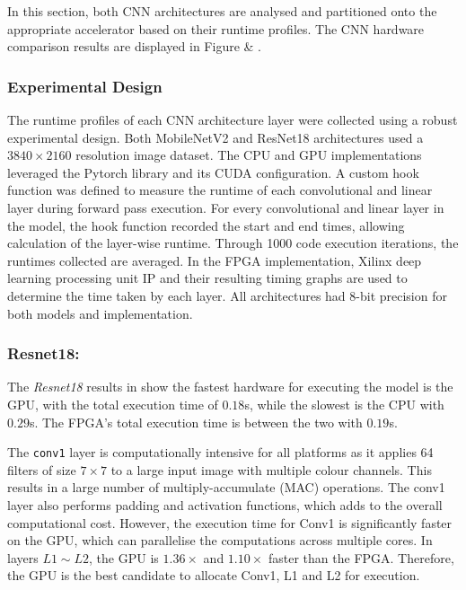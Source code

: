 In this section, both CNN architectures are analysed and partitioned onto the appropriate accelerator based on their runtime profiles. The CNN hardware comparison results are displayed in Figure  \& .

\subsubsection*{Experimental Design}
The runtime profiles of each CNN architecture layer were collected using a robust experimental design. Both MobileNetV2 and ResNet18 architectures used a $3840 \times 2160$ resolution image dataset. The CPU and GPU implementations leveraged the Pytorch library and its CUDA configuration. A custom hook function was defined to measure the runtime of each convolutional and linear layer during forward pass execution. For every convolutional and linear layer in the model, the hook function recorded the start and end times, allowing calculation of the layer-wise runtime. Through 1000 code execution iterations, the runtimes collected are averaged. In the FPGA implementation, Xilinx deep learning processing unit IP and their resulting timing graphs are used to determine the time taken by each layer. All architectures had 8-bit precision for both models and implementation.



\subsubsection{\textbf{Resnet18:}}
The \textit{Resnet18} results in  show the fastest hardware for executing the model is the GPU, with the total execution time of $0.18$s, while the slowest is the CPU with $0.29$s. The FPGA's total execution time is between the two with $0.19$s.

The \texttt{conv1} layer is computationally intensive for all 
platforms as it applies 64 filters of size $7\times7$ to a large input image with multiple colour channels. This results in a large number of multiply-accumulate (MAC) operations. The conv1 layer also performs padding and activation functions, which adds to the overall computational cost. However, the execution time for Conv1 is significantly faster on the GPU, which can parallelise the computations across multiple cores. In layers $L1\sim L2$, the GPU is $1.36\times$ and $1.10\times$ faster than the FPGA. Therefore, the GPU is the best candidate to allocate Conv1, L1 and L2 for execution. 

